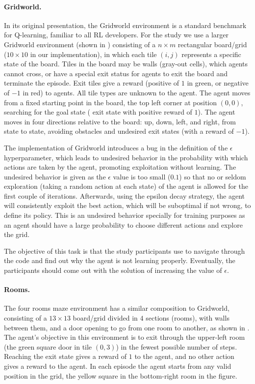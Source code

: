 \paragraph{\textbf{Gridworld.}}
In its original presentation, the Gridworld environment is a standard benchmark for Q-learning, 
familiar to all \ac{RL} developers. For the study we use a larger Gridworld environment (shown in 
) consisting of a $n \times m$ rectangular  board/grid ($10\times 10$ in our 
implementation), in which each tile $(i,j)$ represents a specific state of the board. Tiles in the board 
may be walls (\ie gray-out cells), which agents cannot cross, or have a special exit status for agents 
to exit the board and terminate the episode. Exit tiles give a reward (positive of $1$ in green, or 
negative of $-1$ in red) to agents. All tile types are unknown to the agent. The agent moves from a 
fixed starting point in the board, the top left corner at position $(0,0)$, searching for the goal state (\ie 
exit state with positive reward of $1$). The agent moves in four directions relative to the board: up, 
down, left, and right, from state to state, avoiding obstacles and undesired exit states (with a reward 
of $-1$). 

The implementation of Gridworld introduces a bug in the definition of the $\epsilon$ hyperparameter, 
which leads to undesired behavior in the probability with which actions are taken by the agent, 
promoting exploitation without learning. The undesired behavior is given as the $\epsilon$ value is too 
small (\eg $0.1$) so that no or seldom exploration (taking a random action at each state) of the agent 
is allowed for the first couple of iterations. Afterwards, using the epsilon decay strategy, the agent will 
consistently exploit the best action, which will be suboptimal if not wrong, to define its policy. This is 
an undesired behavior specially for training purposes as an agent should have a large probability to 
choose different actions and explore the grid. 

The objective of this task is that the study participants use \flik to navigate through the code and find 
out why the agent is not learning properly. Eventually, the participants should come out with the 
solution of increasing the value of $\epsilon$. 

\paragraph{\textbf{Rooms.}} 
The four rooms maze environment has a similar composition to Gridworld, consisting of a 
$13\times 13$ board/grid divided in $4$ sections (\ie rooms), with walls between them, and a door 
opening to go from one room to another, as shown in . The agent's objective in this 
environment is to exit through the upper-left room (the green square door in tile $(0,3)$) in the fewest 
possible number of steps. Reaching the exit state gives a reward of $1$ to the agent, and no 
other action gives a reward to the agent. In each episode the agent starts from any valid position in the 
grid, \eg the yellow square in the bottom-right room in the figure. 

